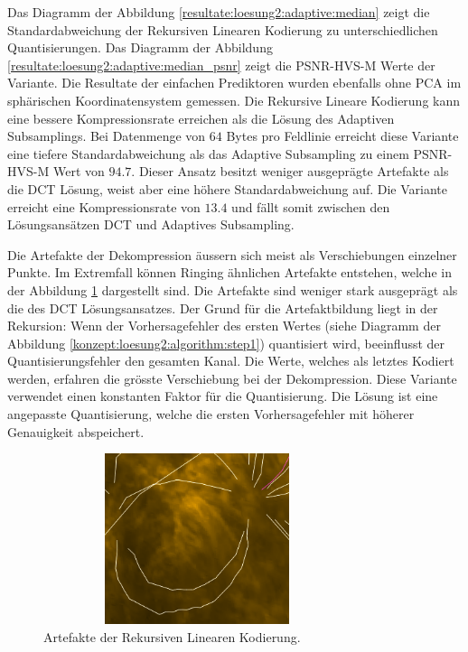 Das Diagramm der Abbildung \ref{resultate:loesung2:adaptive:median} zeigt die Standardabweichung der Rekursiven Linearen Kodierung zu unterschiedlichen Quantisierungen. Das Diagramm der Abbildung \ref{resultate:loesung2:adaptive:median_psnr} zeigt die PSNR-HVS-M Werte der Variante. Die Resultate der einfachen Prediktoren wurden ebenfalls ohne PCA im sphärischen Koordinatensystem gemessen. Die Rekursive Lineare Kodierung kann eine bessere Kompressionsrate erreichen als die Lösung des Adaptiven Subsamplings. Bei Datenmenge von $64$ Bytes pro Feldlinie erreicht diese Variante eine tiefere Standardabweichung als das Adaptive Subsampling zu einem PSNR-HVS-M Wert von $94.7$. Dieser Ansatz besitzt weniger ausgeprägte Artefakte als die DCT Lösung, weist aber eine höhere Standardabweichung auf. Die Variante erreicht eine Kompressionsrate von $13.4$ und fällt somit zwischen den Lösungsansätzen DCT und Adaptives Subsampling.

Die Artefakte der Dekompression äussern sich meist als Verschiebungen einzelner Punkte. Im Extremfall können Ringing ähnlichen Artefakte entstehen, welche in der Abbildung \ref{resultate:loesung2:adaptive:median:artefakte} dargestellt sind. Die Artefakte sind weniger stark ausgeprägt als die des DCT Lösungsansatzes. Der Grund für die Artefaktbildung liegt in der Rekursion: Wenn der Vorhersagefehler des ersten Wertes (siehe Diagramm der Abbildung \ref{konzept:loesung2:algorithm:step1}) quantisiert wird, beeinflusst der Quantisierungsfehler den gesamten Kanal. Die Werte, welches als letztes Kodiert werden, erfahren die grösste Verschiebung bei der Dekompression. Diese Variante verwendet einen konstanten Faktor für die Quantisierung. Die Lösung ist eine angepasste Quantisierung, welche die ersten Vorhersagefehler mit höherer Genauigkeit abspeichert. 

\begin{figure}[!htbp]
	\center
	\includegraphics[width=0.8\textwidth,height=5cm,keepaspectratio]{./pictures/resultate/loesung2/variante2/artefakte1.png}
	\caption{Artefakte der Rekursiven Linearen Kodierung.}
	\label{resultate:loesung2:adaptive:median:artefakte}
\end{figure}

